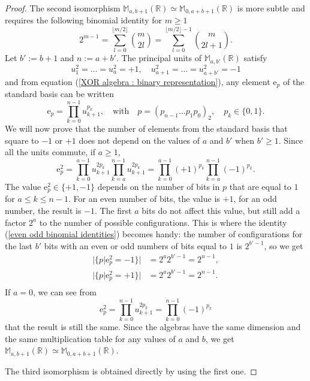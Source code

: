 \documentclass{article}
\begin{document}
\begin{proof}
    The second isomorphism $\mathbb{M}_{a,b+1}(\mathbb{R}) \simeq \mathbb{M}_{0,a+b+1}(\mathbb{R})$ is more subtle and requires the following binomial identity \cite{GrahamKnuthPatashnik} for $m \geq 1$
    \begin{equation}
        \label{even odd binomial identities}
        2^{m-1} = \sum_{l=0}^{\lfloor m/2 \rfloor} \binom{m}{2l} = \sum_{l=0}^{\lfloor m/2 \rfloor-1} \binom{m}{2l + 1}.
    \end{equation}
    Let $b' := b+1$ and $n := a + b'$. The principal units of $\mathbb{M}_{a,b'}(\mathbb{R})$ satisfy
    $$ u_1^2 = \ldots = u_a^2 = +1, \quad u_{a+1}^2 = \ldots = u_{a + b'}^2 = -1 $$
    and from equation (\ref{XOR algebra : binary representation}), any element $\mathrm e_p$ of the standard basis can be written
    $$ \mathrm e_p = \prod_{k=0}^{n-1} u_{k+1}^{p_k}, \quad \text{with} \quad p = (p_{n-1}\ldots p_1 p_0)_2, \quad p_k \in \{ 0,1 \}. $$
    We will now prove that the number of elements from the standard basis that square to $-1$ or $+1$ does not depend on the values of $a$ and $b'$ when $b' \geq 1$. Since all the units commute, if $a \geq 1$,
    $$ \mathrm e_p^2 = \prod_{k=0}^{a-1} u_{k+1}^{2p_k} \prod_{k=a}^{n-1} u_{k+1}^{2p_k} = \prod_{k=0}^{a-1} (+1)^{p_k} \prod_{k=a}^{n-1} (-1)^{p_k}. $$
    The value $\mathrm e_p^2 \in \{ +1, -1 \}$ depends on the number of bits in $p$ that are equal to $1$ for $a \leq k \leq n-1$. For an even number of bits, the value is $+1$, for an odd number, the result is $-1$. The first $a$ bits do not affect this value, but still add a factor $2^a$ to the number of possible configurations. This is where the identity (\ref{even odd binomial identities}) becomes handy: the number of configurations for the last $b'$ bits with an even or odd numbers of bits equal to $1$ is $2^{b'-1}$, so we get
    $$ \begin{aligned}
        |\{ p | \mathrm e_p^2=-1 \}| &= 2^a 2^{b'-1} = 2^{n-1},\\
        |\{ p | \mathrm e_p^2=+1 \}| &= 2^a 2^{b'-1} = 2^{n-1}.\\
    \end{aligned} $$
    If $a = 0$, we can see from 
    $$ \mathrm e_p^2 = \prod_{k=0}^{n-1} u_{k+1}^{2p_k} = \prod_{k=0}^{n-1} (-1)^{p_k} $$
    that the result is still the same. Since the algebras have the same dimension and the same multiplication table for any values of $a$ and $b$, we get $\mathbb{M}_{a,b+1}(\mathbb{R}) \simeq \mathbb{M}_{0,a+b+1}(\mathbb{R})$.

    The third isomorphism is obtained directly by using the first one.
\end{proof}
\end{document}
